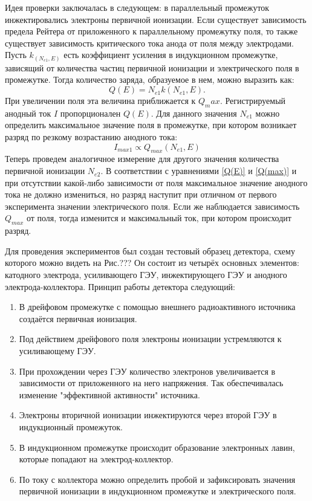 \par Идея проверки заключалась в следующем: в параллельный промежуток инжектировались электроны первичной ионизации. Если существует зависимость предела Рейтера от приложенного к параллельному промежутку поля, то также существует зависимость критического тока анода от поля между электродами. Пусть $k_(N_{e1},E)$ есть коэффициент усиления в индукционном промежутке, зависящий от количества частиц первичной ионизации и электрического поля в промежутке. Тогда количество заряда, образуемое в нем, можно выразить как: 
\begin{equation}
Q(E) = N_{e1} k(N_{e1},E).
\label{Q(E)}
\end{equation}
При увеличении поля эта величина приближается к $Q_max$. Регистрируемый анодный ток $I$ пропорционален $Q(E)$. Для данного значения $N_{e1}$ можно определить максимальное значение поля в промежутке, при котором возникает разряд по резкому возрастанию анодного тока:
\begin{equation}
 I_{max1} \propto Q_{max}(N_{e1},E)
\end{equation}
Теперь проведем аналогичное измерение для другого значения количества первичной ионизации $N_{e2}$. В соответствии с уравнениями \ref{Q(E)} и \ref{Q(max)} и при отсутствии какой-либо зависимости от поля максимальное значение анодного тока не должно измениться, но разряд наступит при отличном от первого эксперимента значении электрического поля. Если же наблюдается зависимость $Q_{max}$ от поля, тогда изменится и максимальный ток, при котором происходит разряд.
\par Для проведения экспериментов был создан тестовый образец детектора, схему которого можно видеть на Рис.??? Он состоит из четырёх основных элементов: катодного электрода, усиливающего ГЭУ, инжектирующего ГЭУ и анодного электрода-коллектора. Принцип работы детектора следующий: 
\begin{enumerate}
	\item В дрейфовом промежутке с помощью внешнего радиоактивного источника создаётся первичная ионизация.
	\item Под действием дрейфового поля электроны ионизации устремляются к усиливающему ГЭУ.
	\item При прохождении через ГЭУ количество электронов увеличивается в зависимости от приложенного на него напряжения. Так обеспечивалась изменение "эффективной активности" источника.  
	\item Электроны вторичной ионизации инжектируются через второй ГЭУ в индукционный промежуток. 
	\item В индукционном промежутке происходит образование электронных лавин, которые попадают на электрод-коллектор. 
	\item По току с коллектора можно определить пробой и зафиксировать значения первичной ионизации в индукционном промежутке и электрического поля. 	
\end{enumerate}
